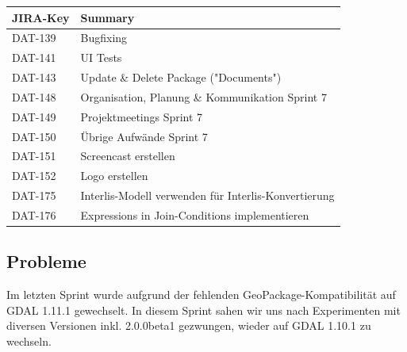 \begin{table}[H]	
\centering
\begin{tabular}{ll}
\toprule
\textbf{JIRA-Key} & \textbf{Summary}\\
\midrule
DAT-139 & Bugfixing \\
DAT-141 & UI Tests \\
DAT-143 & Update \& Delete Package ("Documents") \\
DAT-148 & Organisation, Planung \& Kommunikation Sprint 7 \\
DAT-149 & Projektmeetings Sprint 7 \\
DAT-150 & Übrige Aufwände Sprint 7 \\
DAT-151 & Screencast erstellen \\
DAT-152 & Logo erstellen \\
DAT-175 & Interlis-Modell verwenden für Interlis-Konvertierung \\
DAT-176 & Expressions in Join-Conditions implementieren \\
\bottomrule
\end{tabular}	
\end{table}

\subsection*{Probleme}
Im letzten Sprint wurde aufgrund der fehlenden GeoPackage-Kompatibilität auf GDAL 1.11.1 gewechselt. In diesem Sprint sahen wir uns nach Experimenten mit diversen Versionen inkl. 2.0.0beta1 gezwungen, wieder auf GDAL 1.10.1 zu wechseln.